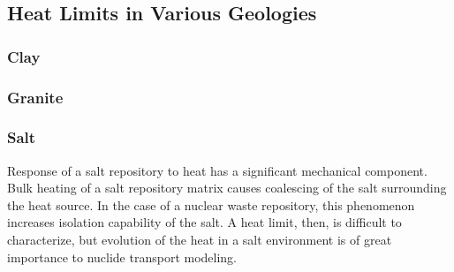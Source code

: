 \subsection{Heat Limits in Various Geologies}

\subsubsection{Clay}
% 


\subsubsection{Granite}

\subsubsection{Salt}
Response of a salt repository to heat has a significant mechanical 
component. Bulk heating of a salt repository matrix causes coalescing  
of the salt surrounding the heat source. In the case of a nuclear 
waste repository, this phenomenon increases isolation capability of 
the salt. A heat limit, then, is difficult to characterize, but 
evolution of the heat in a salt environment is of great importance to 
nuclide transport modeling. 

